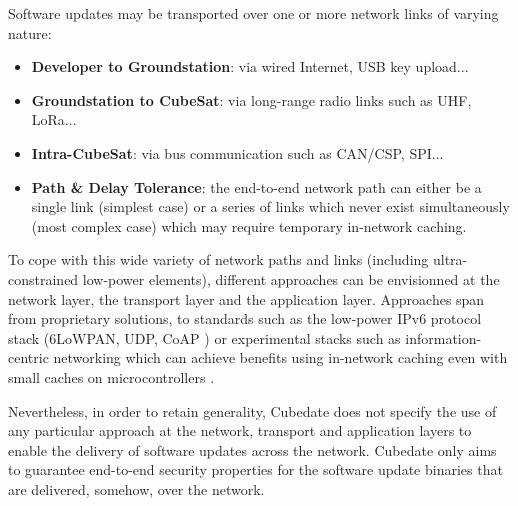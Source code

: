 Software updates may be transported over one or more network links of varying nature: 
\begin{itemize}
\item {\bf Developer to Groundstation}: via wired Internet, USB key upload...
\item {\bf Groundstation to CubeSat}: via long-range radio links such as UHF, LoRa...
\item {\bf Intra-CubeSat}: via bus communication such as CAN/CSP, SPI...
\item {\bf Path \& Delay Tolerance}: the end-to-end network path can either be a single link (simplest case) or a series of links which never exist simultaneously (most complex case) which may require temporary in-network caching.
\end{itemize}

To cope with this wide variety of network paths and links (including ultra-constrained low-power elements), different approaches can be envisionned at the network layer, the transport layer and the application layer. Approaches span from proprietary solutions, to standards such as the low-power IPv6 protocol stack (6LoWPAN, UDP, CoAP \cite{morabito2020ietf}) or experimental stacks such as information-centric networking which can achieve benefits using in-network caching even with small caches on microcontrollers \cite{hahm2017low}. 

Nevertheless, in order to retain generality, Cubedate does not specify the use of any particular approach at the network, transport and application layers to enable the delivery of software updates across the network.
Cubedate only aims to guarantee end-to-end security properties for the software update binaries that are delivered, somehow, over the network.

